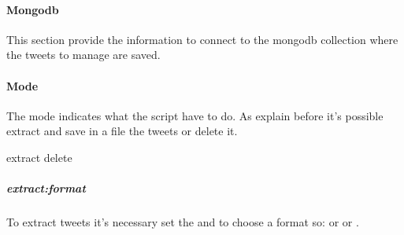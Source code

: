 \documentclass[letterpaper,10pt,english]{sphinxmanual}
\begin{document}
\paragraph{Mongodb}
\label{\detokenize{guide/manage_tweets_guide:mongodb}}
\begin{sphinxVerbatim}[commandchars=\\\{\}]
     
\end{sphinxVerbatim}

\sphinxAtStartPar
This section provide the information to connect to the mongodb collection where the tweets to manage are saved.


\paragraph{Mode}
\label{\detokenize{guide/manage_tweets_guide:mode}}
\begin{sphinxVerbatim}[commandchars=\\\{\}]
    
\end{sphinxVerbatim}

\begin{DUlineblock}{0em}
\item[] The mode indicates what the script have to do. As explain before it’s possible extract and save in a file the tweets or delete it.
\item[]  extract delete
\item[] 
\end{DUlineblock}


\subparagraph{extract:format}
\label{\detokenize{guide/manage_tweets_guide:extract-format}}
\begin{sphinxVerbatim}[commandchars=\\\{\}]
   
\end{sphinxVerbatim}

\begin{DUlineblock}{0em}
\item[] To extract tweets it’s necessary set the  and to choose a format so: or  or .
\end{DUlineblock}
\end{document}

